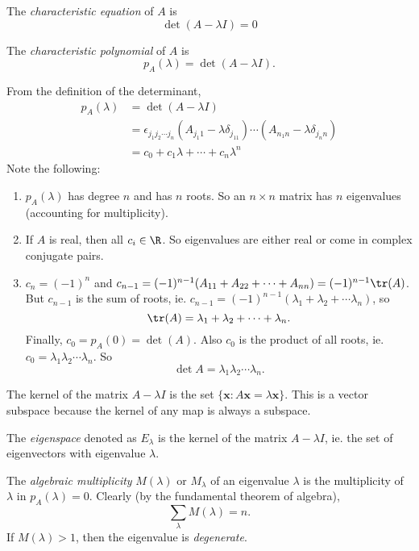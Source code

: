 \documentclass[a4paper]{article}
\begin{document}
\begin{defi}
  The \emph{characteristic equation} of $A$ is
  \[
    \det(A - \lambda I) = 0
  \]
\end{defi}

\begin{defi}
  The \emph{characteristic polynomial} of $A$ is
  \[
    p_A(\lambda) = \det(A - \lambda I).
  \]
\end{defi}

From the definition of the determinant,
\begin{align*}
  p_A(\lambda) &= \det(A - \lambda I)\\
  &= \epsilon_{j_1j_2\cdots j_n} (A_{j_1 1} - \lambda\delta_{j_11})\cdots (A_{n_1 n} - \lambda\delta_{j_nn})\\
  &= c_0 + c_1\lambda + \cdots + c_n\lambda^n
\end{align*}
Note the following:
\begin{enumerate}
  \item $p_A(\lambda)$ has degree $n$ and has $n$ roots. So an $n\times n$ matrix has $n$ eigenvalues (accounting for multiplicity).
  \item If $A$ is real, then all $c_i\in \R$. So eigenvalues are either real or come in complex conjugate pairs.
  \item $c_n = (-1)^n$ and $c_{n - 1} = (-1)^{n - 1}(A_{11} + A_{22} + \cdots + A_{nn}) = (-1)^{n - 1}\tr(A)$. But $c_{n -1}$ is the sum of roots, ie. $c_{n - 1}= (-1)^{n - 1}(\lambda_1 + \lambda_2 + \cdots \lambda_n)$, so
    \[
      \tr(A) = \lambda_1 + \lambda_2 + \cdots + \lambda_n.
    \]
    Finally, $c_0 = p_A(0) = \det(A)$. Also $c_0$ is the product of all roots, ie. $c_0 = \lambda_1\lambda_2\cdots \lambda_n$. So
    \[
      \det A = \lambda_1\lambda_2\cdots \lambda_n.
    \]
\end{enumerate}

The kernel of the matrix $A - \lambda I$ is the set $\{\mathbf{x}: A\mathbf{x} = \lambda\mathbf{x}\}$. This is a vector subspace because the kernel of any map is always a subspace.

\begin{defi}[Eigenspace]
  The \emph{eigenspace} denoted as $E_\lambda$ is the kernel of the matrix $A - \lambda I$, ie. the set of eigenvectors with eigenvalue $\lambda$.
\end{defi}

\begin{defi}
  The \emph{algebraic multiplicity} $M(\lambda)$ or $M_\lambda$ of an eigenvalue $\lambda$ is the multiplicity of $\lambda$ in $p_A(\lambda) = 0$. Clearly (by the fundamental theorem of algebra),
  \[
    \sum_\lambda M(\lambda) = n.
  \]
  If $M(\lambda) > 1$, then the eigenvalue is \emph{degenerate}.
\end{defi}
\end{document}
